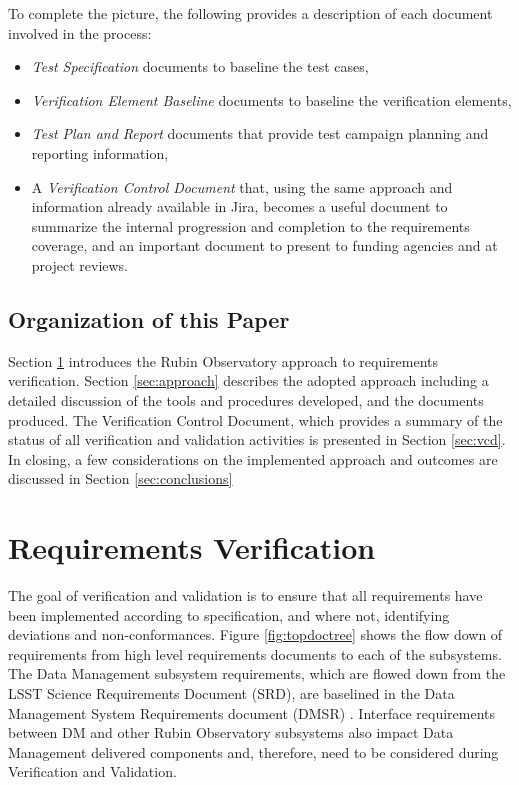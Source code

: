 To complete the picture, the following provides a description of each document involved in the process:
\begin{itemize}
\item  {\textit{Test Specification} documents to baseline the test cases, }
\item {\textit{Verification Element Baseline} documents to baseline the verification elements,}
\item  {\textit{Test Plan and Report} documents that provide test campaign planning and reporting information,}
\item  {A \textit{Verification Control Document} that, using the same approach and information already available in Jira, becomes a useful document to summarize the  internal progression and completion to the requirements coverage, and an important document to present to funding agencies and at project reviews. }
\end{itemize}

\subsection{Organization of this Paper}
Section \ref{sec:vandvproblem} introduces the Rubin Observatory approach to requirements verification. 
Section \ref{sec:approach} describes the adopted approach including a detailed discussion of the tools and procedures developed,  and the documents produced. 
The Verification Control Document, which provides a summary of the status of all verification and validation activities is presented in Section \ref{sec:vcd}.  
In closing, a few considerations on the implemented approach and outcomes are discussed in Section \ref{sec:conclusions} 

\section{Requirements Verification}
\label{sec:vandvproblem}
The goal of verification and validation is to ensure that all requirements have been implemented according to specification, and where not, identifying deviations and non-conformances. 
Figure \ref{fig:topdoctree} shows the flow down of requirements from high level requirements documents to each of the subsystems. 
The Data Management subsystem requirements, which are flowed down from the LSST Science Requirements Document (SRD)\cite{LPM-17}, are baselined in the Data Management System Requirements document (DMSR) \cite{LSE-61}.
Interface requirements between DM and other Rubin Observatory subsystems also impact Data Management delivered components and, therefore, need to be considered during Verification and Validation.

